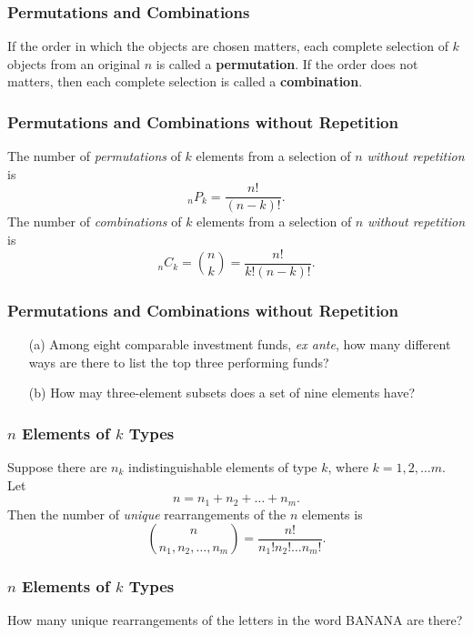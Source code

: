 \documentclass{beamer}
\begin{document}
\begin{frame}
\frametitle{Permutations and Combinations}
\begin{Definition}
If the order in which the objects are chosen matters, each complete selection of $k$ objects from an original $n$ is called a {\bf permutation}. If the order does not matters, then each complete selection is called a {\bf combination}.
\end{Definition} 

\end{frame}

\begin{frame}
\frametitle{Permutations and Combinations without Repetition}

The number of {\it permutations} of $k$ elements from a selection of $n$ {\it without repetition} is 
$$
_n P_k = \frac{n!}{(n - k)!}.
$$
The number of {\it combinations} of $k$ elements from a selection of $n$ {\it without repetition} is 
$$
_nC_k = {n\choose k} =  \frac{n!}{k!(n-k)!}.
$$

\end{frame}

\begin{frame}[t]
\frametitle{Permutations and Combinations without Repetition}
\begin{Example}
\begin{enumerate}
\item[(a)] Among eight comparable investment funds, {\it ex ante}, how many different ways are there to list the top three performing funds?
\item[(b)] How may three-element subsets does a set of nine elements have?
\end{enumerate}
\end{Example}
\end{frame}

\begin{frame}
\frametitle{$n$ Elements of $k$ Types}
Suppose there are $n_k$ indistinguishable elements of type $k$, where $k = 1, 2,\ldots m$. Let
$$
n = n_1 + n_2 + \ldots + n_m.
$$
Then the number of {\it unique} rearrangements of the $n$ elements is
$$
{n \choose n_1, n_2,\ldots, n_m} = \frac{n!}{n_1! n_2!\ldots n_m!}.
$$
\end{frame}

\begin{frame}[t]
\frametitle{$n$ Elements of $k$ Types}
\begin{Example}
How many unique rearrangements of the letters in the word BANANA are there?
\end{Example}
\end{frame}
\end{document}
